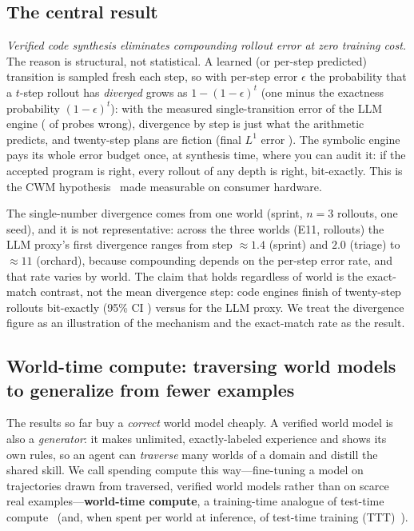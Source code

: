\documentclass[11pt]{article}
\begin{document}
\subsection{The central result}\label{sec:central-result}
\emph{Verified code synthesis eliminates compounding rollout error at zero
training cost.} The reason is structural, not statistical. A learned (or
per-step predicted) transition is sampled fresh each step, so with per-step error
$\epsilon$ the probability that a $t$-step rollout has \emph{diverged} grows as
$1-(1-\epsilon)^{t}$ (one minus the exactness probability $(1-\epsilon)^t$): with the measured
single-transition error of the LLM engine (\LLMProbeErrorRate{} of probes wrong),
divergence by step \LLMFirstDivergence{} is just what the arithmetic
predicts, and twenty-step plans are fiction (final $L^1$ error
\LLMFinalLOne). The symbolic engine pays its whole error budget once,
at synthesis time, where you can audit it: if the accepted program is right,
every rollout of any depth is right, bit-exactly. This is the CWM
hypothesis~\cite{worldcoder2024,cwmgames2025} made measurable on consumer
hardware.

The single-number divergence \LLMFirstDivergence{} comes from one world (sprint,
$n{=}3$ rollouts, one seed), and it is not representative: across the three
worlds (E11, \MultiWorldRollouts{} rollouts) the LLM proxy's first divergence
ranges from step ${\approx}1.4$ (sprint) and $2.0$ (triage) to ${\approx}11$ (orchard),
because compounding depends on the per-step error rate, and that rate varies by world.
The claim that holds regardless of world is the exact-match contrast, not the mean
divergence step: code engines finish \MultiCodeExact{} of \MultiWorldRollouts{}
twenty-step rollouts bit-exactly (95\% CI \MultiCodeCI) versus \MultiLLMExact{}
for the LLM proxy. We treat the divergence figure as an illustration of the
mechanism and the exact-match rate as the result.

\subsection{World-time compute: traversing world models to generalize from fewer examples}\label{sec:world-time}
The results so far buy a \emph{correct} world model cheaply. A verified world model is also a
\emph{generator}: it makes unlimited, exactly-labeled experience and shows its own
rules, so an agent can \emph{traverse} many worlds of a domain and distill the shared skill.
We call spending compute this way---fine-tuning a model on trajectories drawn from traversed,
verified world models rather than on scarce real examples---\textbf{world-time compute}, a
training-time analogue of test-time compute~\cite{snell2024testtime,openai2024o1,deepseekr1}
(and, when spent per world at inference, of test-time training (TTT)~\cite{akyurek2024ttt}).
\end{document}
